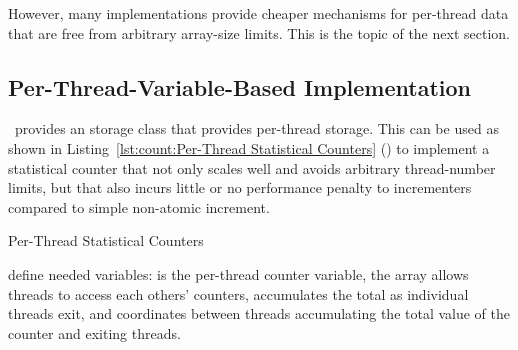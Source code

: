 \QuickQuizLabel{\StatisticalCounterAccuracy}

However, many implementations provide cheaper mechanisms for
per-thread data that are free from arbitrary array-size limits.
This is the topic of the next section.

\subsection{Per-Thread-Variable-Based Implementation}
\label{sec:count:Per-Thread-Variable-Based Implementation}

\GCC\ provides an  storage class that provides
per-thread storage.
This can be used as shown in
Listing~\ref{lst:count:Per-Thread Statistical Counters} ()
to implement
a statistical counter that not only scales well and avoids arbitrary
thread-number limits, but that also incurs little or no performance
penalty to incrementers compared to simple non-atomic increment.

\begin{listing}

\caption{Per-Thread Statistical Counters}
\label{lst:count:Per-Thread Statistical Counters}
\end{listing}

\begin{fcvref}
 define needed variables:
 is the per-thread counter
variable, the  array allows threads to access each others'
counters,  accumulates the total as individual threads exit,
and  coordinates between threads accumulating the total
value of the counter and exiting threads.
\end{fcvref}

